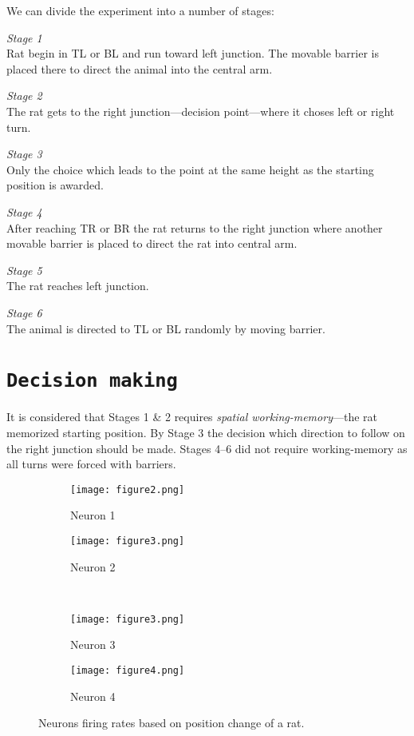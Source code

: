 \documentclass[12pt,a4paper,twocolumn]{article}
\begin{document}
We can divide the experiment into a number of stages:
\begin{description}
\item{\emph{Stage 1}} \hfill\\
Rat begin in TL or BL and run toward left junction. The movable barrier is placed there to direct the animal into the central arm.
\item{\emph{Stage 2}} \hfill\\
The rat gets to the right junction---decision point---where it choses left or right turn.
\item{\emph{Stage 3}} \hfill\\
Only the choice which leads to the point at the same height as the starting position is awarded.
\item{\emph{Stage 4}} \hfill\\
After reaching TR or BR the rat returns to the right junction where another movable barrier is placed to direct the rat into central arm.
\item{\emph{Stage 5}} \hfill\\
The rat reaches left junction.
\item{\emph{Stage 6}} \hfill\\
The animal is directed to TL or BL randomly by moving barrier.
\end{description}


\section*{\texttt{Decision making}}
It is considered that Stages 1 \& 2 requires \emph{spatial working-memory}---the rat memorized starting position. By Stage 3 the decision which direction to follow on the right junction should be made. Stages 4--6 did not require working-memory as all turns were forced with barriers.\\

\begin{figure}[htbp]
  \begin{subfigure}{.49\linewidth}\centering
    \texttt{[image: figure2.png]}
    \caption{Neuron 1\label{fig:FiringPosition_N1}}
  \end{subfigure}
  \begin{subfigure}{.49\linewidth}\centering
    \texttt{[image: figure3.png]}
    \caption{Neuron 2\label{fig:FiringPosition_N2}}
  \end{subfigure}\\[1ex]

    \begin{subfigure}{.49\linewidth}\centering
    \texttt{[image: figure3.png]}
    \caption{Neuron 3\label{fig:FiringPosition_N3}}
  \end{subfigure}
  \begin{subfigure}{.49\linewidth}\centering
    \texttt{[image: figure4.png]}
    \caption{Neuron 4\label{fig:FiringPosition_N4}}
  \end{subfigure}

  \caption{Neurons firing rates based on position change of a rat.\label{fig:FiringPosition_ALL}}
\end{figure}
\end{document}
